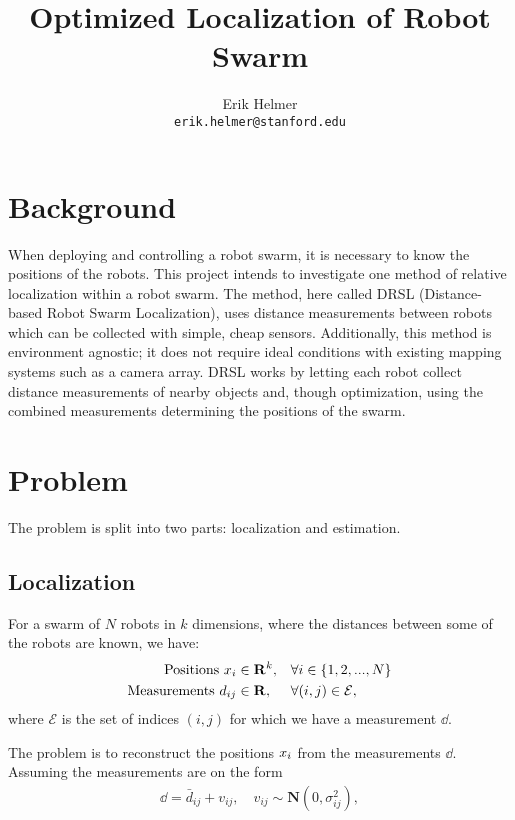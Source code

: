 \documentclass{IEEEtran}
\begin{document}
\title{Optimized Localization of Robot Swarm}

\author{\Large Erik Helmer \\ \small \texttt{erik.helmer@stanford.edu}}

\maketitle

\section{Background}
When deploying and controlling a robot swarm, it is necessary to know the positions of the robots. This project intends to investigate one method of relative localization within a robot swarm. The method, here called DRSL (Distance-based Robot Swarm Localization), uses distance measurements between robots which can be collected with simple, cheap sensors. Additionally, this method is environment agnostic; it does not require ideal conditions with existing mapping systems such as a camera array. DRSL works by letting each robot collect distance measurements of nearby objects and, though optimization, using the combined measurements determining the positions of the swarm.

\section{Problem}
The problem is split into two parts: localization and estimation.
\subsection{Localization}
For a swarm of $N$ robots in $k$ dimensions, where the distances between some of the robots are known, we have: 
\begin{align}
    \text{Positions } x_{i} &\in \mathbf{R}^k, &&\forall i \in \{1, 2, ..., N\}\\
    \text{Measurements } d_{ij} &\in \mathbf{R},&&\forall (i,j) \in \mathcal{E},
\end{align}
where $\mathcal{E}$ is the set of indices $(i, j)$ for which we have a measurement $\dd$.

The problem is to reconstruct the positions $x_{i}$ from the measurements $\dd$. Assuming the measurements are on the form 
\begin{align}
    \dd = \bar{d}_{ij} + v_{ij}, \quad v_{ij} \sim \mathbf{N}(0, \sigma^2_{ij}),
\end{align}
\end{document}
